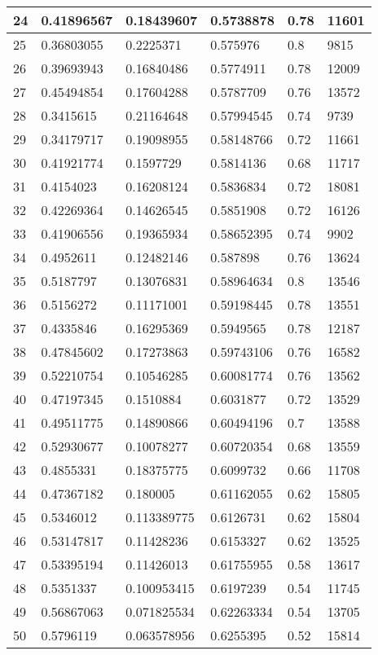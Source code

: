 \begin{longtable}{|l|l|l|l|l|l|}
24 & 0.41896567 & 0.18439607 & 0.5738878 & 0.78 & 11601 \\ \hline 
25 & 0.36803055 & 0.2225371 & 0.575976 & 0.8 & 9815 \\ \hline 
26 & 0.39693943 & 0.16840486 & 0.5774911 & 0.78 & 12009 \\ \hline 
27 & 0.45494854 & 0.17604288 & 0.5787709 & 0.76 & 13572 \\ \hline 
28 & 0.3415615 & 0.21164648 & 0.57994545 & 0.74 & 9739 \\ \hline 
29 & 0.34179717 & 0.19098955 & 0.58148766 & 0.72 & 11661 \\ \hline 
30 & 0.41921774 & 0.1597729 & 0.5814136 & 0.68 & 11717 \\ \hline 
31 & 0.4154023 & 0.16208124 & 0.5836834 & 0.72 & 18081 \\ \hline 
32 & 0.42269364 & 0.14626545 & 0.5851908 & 0.72 & 16126 \\ \hline 
33 & 0.41906556 & 0.19365934 & 0.58652395 & 0.74 & 9902 \\ \hline 
34 & 0.4952611 & 0.12482146 & 0.587898 & 0.76 & 13624 \\ \hline 
35 & 0.5187797 & 0.13076831 & 0.58964634 & 0.8 & 13546 \\ \hline 
36 & 0.5156272 & 0.11171001 & 0.59198445 & 0.78 & 13551 \\ \hline 
37 & 0.4335846 & 0.16295369 & 0.5949565 & 0.78 & 12187 \\ \hline 
38 & 0.47845602 & 0.17273863 & 0.59743106 & 0.76 & 16582 \\ \hline 
39 & 0.52210754 & 0.10546285 & 0.60081774 & 0.76 & 13562 \\ \hline 
40 & 0.47197345 & 0.1510884 & 0.6031877 & 0.72 & 13529 \\ \hline 
41 & 0.49511775 & 0.14890866 & 0.60494196 & 0.7 & 13588 \\ \hline 
42 & 0.52930677 & 0.10078277 & 0.60720354 & 0.68 & 13559 \\ \hline 
43 & 0.4855331 & 0.18375775 & 0.6099732 & 0.66 & 11708 \\ \hline 
44 & 0.47367182 & 0.180005 & 0.61162055 & 0.62 & 15805 \\ \hline 
45 & 0.5346012 & 0.113389775 & 0.6126731 & 0.62 & 15804 \\ \hline 
46 & 0.53147817 & 0.11428236 & 0.6153327 & 0.62 & 13525 \\ \hline 
47 & 0.53395194 & 0.11426013 & 0.61755955 & 0.58 & 13617 \\ \hline 
48 & 0.5351337 & 0.100953415 & 0.6197239 & 0.54 & 11745 \\ \hline 
49 & 0.56867063 & 0.071825534 & 0.62263334 & 0.54 & 13705 \\ \hline 
50 & 0.5796119 & 0.063578956 & 0.6255395 & 0.52 & 15814 \\ \hline 
\end{longtable}